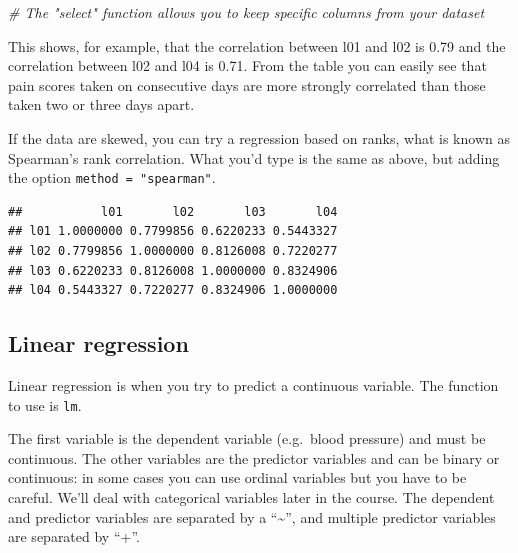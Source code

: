 \documentclass[]{book}
\newenvironment{Shaded}{\begin{snugshade}}{\end{snugshade}}
\newcommand{\CommentTok}[1]{\textcolor[rgb]{0.56,0.35,0.01}{\textit{#1}}}
\newcommand{\DataTypeTok}[1]{\textcolor[rgb]{0.13,0.29,0.53}{#1}}
\newcommand{\KeywordTok}[1]{\textcolor[rgb]{0.13,0.29,0.53}{\textbf{#1}}}
\newcommand{\NormalTok}[1]{#1}
\newcommand{\OperatorTok}[1]{\textcolor[rgb]{0.81,0.36,0.00}{\textbf{#1}}}
\newcommand{\StringTok}[1]{\textcolor[rgb]{0.31,0.60,0.02}{#1}}
\begin{document}
\begin{Shaded}
\begin{Highlighting}[]
\CommentTok{# The "select" function allows you to keep specific columns from your dataset}
\end{Highlighting}
\end{Shaded}

This shows, for example, that the correlation between l01 and l02 is 0.79 and the correlation between l02 and l04 is 0.71. From the table you can easily see that pain scores taken on consecutive days are more strongly correlated than those taken two or three days apart.

If the data are skewed, you can try a regression based on ranks, what is known as Spearman's rank correlation. What you'd type is the same as above, but adding the option \texttt{method\ =\ "spearman"}.

\begin{Shaded}
\end{Shaded}

\begin{verbatim}
##           l01       l02       l03       l04
## l01 1.0000000 0.7799856 0.6220233 0.5443327
## l02 0.7799856 1.0000000 0.8126008 0.7220277
## l03 0.6220233 0.8126008 1.0000000 0.8324906
## l04 0.5443327 0.7220277 0.8324906 1.0000000
\end{verbatim}

\hypertarget{linear-regression}{%
\subsection{Linear regression}\label{linear-regression}}

Linear regression is when you try to predict a continuous variable. The function to use is \texttt{lm}.

The first variable is the dependent variable (e.g.~blood pressure) and must be continuous. The other variables are the predictor variables and can be binary or continuous: in some cases you can use ordinal variables but you have to be careful. We'll deal with categorical variables later in the course. The dependent and predictor variables are separated by a ``\textasciitilde{}'', and multiple predictor variables are separated by ``+''.
\end{document}
